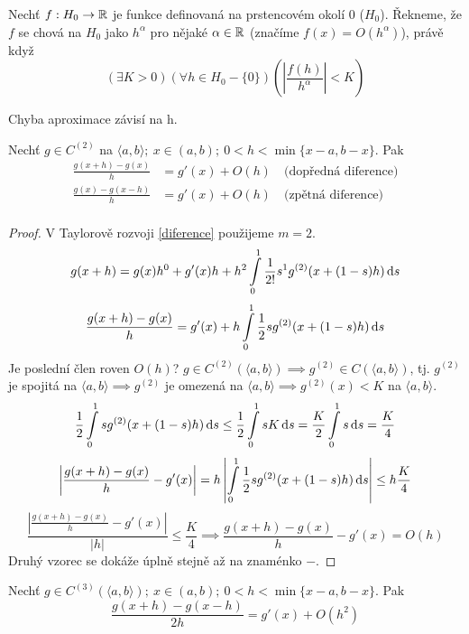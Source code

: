 	\begin{definition}
		Nechť $f:H_0 \rightarrow \mathbb{R}$ je funkce definovaná na prstencovém okolí 0 ($H_0$).
		Řekneme, že $f$ se chová na $H_0$ jako $h^\alpha$ pro nějaké $\alpha \in \mathbb{R}$
		(značíme $f(x) = O(h^\alpha)$), právě když
		\begin{equation} \label{landau}
			(\exists K > 0)(\forall h \in H_0 - \{0\}) 
			\left( \left| \frac{f(h)}{h^\alpha}\right|  <K \right)	
		\end{equation}
		
	\end{definition}
	
	\begin{note}
		Chyba aproximace závisí na h.
	\end{note}
	
	\begin{theorem}
		Nechť $g \in C^{(2)}$ na $\langle a,b \rangle;\ x \in (a,b);\ 0 < h < \min\{x-a, b-x\}$. Pak
		\begin{align*}
			\frac{g(x+h) -g(x)}{h} &= g'(x) + O(h)\quad \text{(dopředná diference)}\\
			\frac{g(x) - g(x-h)}{h} &= g'(x) + O(h)\quad \text{(zpětná diference)}\\
		\end{align*}
	\end{theorem}
	
	\begin{proof}
		V Taylorově rozvoji \eqref{diference} použijeme $m=2$.
		$$ g(x+h) = g(x) h^0 + g'(x)h + h^2 \int\limits_0^1 \frac{1}{2!} s^1 g^{(2)}(x+(1-s)h)\,\mathrm{d}s$$
		$$ \frac{g(x+h) - g(x)}{h} = g'(x) + h\int\limits_0^1 \frac{1}{2} s g^{(2)}(x+(1-s)h)\,\mathrm{d}s$$
		Je poslední člen roven $O(h)$? $g \in C^{(2)}(\langle a, b\rangle) \implies g^{(2)}
		\in C(\langle a, b\rangle)$, tj. $g^{(2)}$ je spojitá na $\langle a, b\rangle \implies
		g^{(2)}$ je omezená na $\langle a, b\rangle \implies g^{(2)}(x) < K$ na
		$\langle a, b\rangle$.
		$$ \frac{1}{2} \int\limits_0^1 s g^{(2)}(x+(1-s)h)\,\mathrm{d}s \leq \frac{1}{2}\int\limits_0^1 sK\,\mathrm{d}s = 
		\frac{K}{2}\int\limits_0^1 s\,\mathrm{d}s = \frac{K}{4}$$
		$$ \left| \frac{g(x+h) - g(x)}{h} - g'(x) \right|= h \left|\int\limits_0^1 \frac{1}{2} s g^{(2)}
		(x + (1 -s) h)\,\mathrm{d}s\right| \leq h\frac{K}{4}$$
		$$ \frac{\left| \frac{g(x+h) - g(x)}{h} - g'(x) \right|}{|h|} \leq \frac{K}{4} \implies
		\frac{g(x+h) - g(x)}{h} - g'(x) = O(h)$$
		Druhý vzorec se dokáže úplně stejně až na znaménko $-$.
	\end{proof}
	
	\begin{theorem}
		Nechť $g \in C^{(3)} (\langle a,b \rangle);\ x \in (a,b);\ 0 < h < \min\{ x-a, b-x\}$.
		Pak
		$$ \frac{g(x+h) - g(x-h)}{2h} = g'(x) + O(h^2)$$
	\end{theorem}
	
